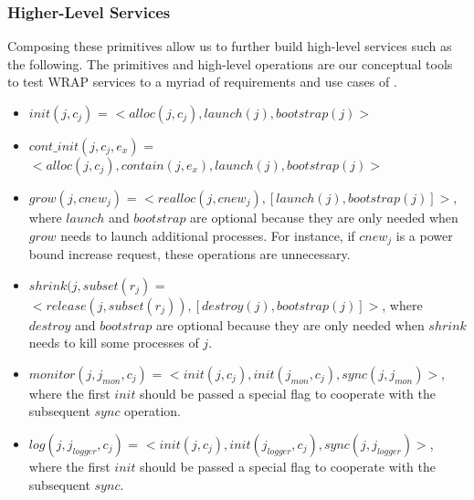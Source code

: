 \subsubsection{Higher-Level Services}
\label{sect:hiop}
Composing these primitives allow us to further build high-level services
such as the following. The primitives and high-level operations are our 
conceptual tools to test WRAP services to a myriad of requirements and use cases of \ngrm.

\begin{itemize}

\item{$init(j, c_j)$ = $<alloc(j, c_j), launch(j), bootstrap(j)>$}

\item{$cont\_init(j, c_j, e_x)$ = $< alloc(j, c_j), contain(j, e_x), launch(j), bootstrap(j) >$}

\item{$grow(j, cnew_j)$ = $<realloc(j, cnew_j), [launch(j), bootstrap(j)]>$,  
where $launch$ and $bootstrap$ are optional because they are only needed when $grow$ needs to launch additional processes. For instance, if $cnew_j$ is a power bound increase request, these operations are unnecessary.}

\item{$shrink(j,subset(r_j)$ = $<release(j, subset(r_j)), [destroy(j), bootstrap(j)]>$, 
where $destroy$ and $bootstrap$ are optional because they are only needed when $shrink$ needs to kill some processes of $j$.}

\item{$monitor(j, j_{mon}, c_j)$ = $<init(j, c_j), init(j_{mon}, c_j), sync(j, j_{mon})>$, where the first $init$ should be passed a special flag to cooperate with the subsequent $sync$ operation.}

\item{$log(j, j_{logger}, c_j)$ = $<init(j, c_j), init(j_{logger}, c_j), sync(j, j_{logger})>$, where the first $init$ should be passed a special flag to cooperate with the subsequent $sync$.}

\end{itemize}

